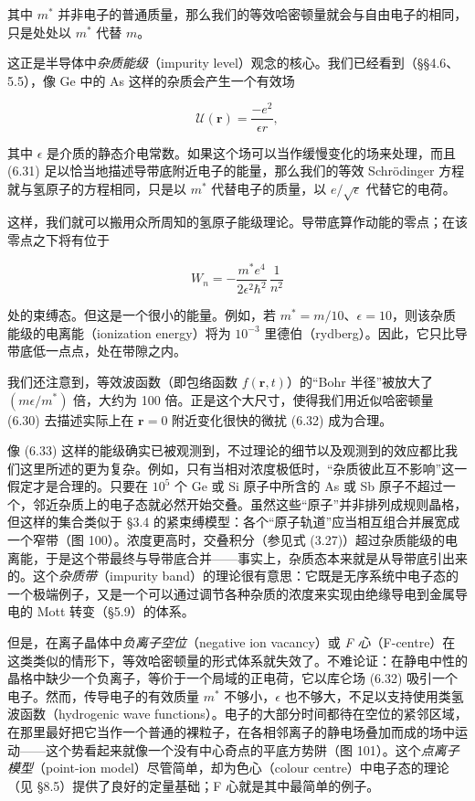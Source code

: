 其中 $m^{*}$ 并非电子的普通质量，那么我们的等效哈密顿量就会与自由电子的相同，只是处处以 $m^{*}$ 代替 $m$。

这正是半导体中\emph{杂质能级}（impurity level）观念的核心。我们已经看到（§§4.6、5.5），像 Ge 中的 As 这样的杂质会产生一个有效场

\begin{equation*}
\mathcal{U}(\mathbf{r}) = \frac{-e^2}{\epsilon r},
\tag{6.32}
\end{equation*}

其中 $\epsilon$ 是介质的静态介电常数。如果这个场可以当作缓慢变化的场来处理，而且 (6.31) 足以恰当地描述导带底附近电子的能量，那么我们的等效 Schrödinger 方程就与氢原子的方程相同，只是以 $m^{*}$ 代替电子的质量，以 $e/\sqrt{\epsilon}$ 代替它的电荷。

这样，我们就可以搬用众所周知的氢原子能级理论。导带底算作动能的零点；在该零点之下将有位于

\begin{equation*}
W_n = -\frac{m^{*}e^{4}}{2\epsilon^{2}\hbar^{2}}\,\frac{1}{n^{2}}
\tag{6.33}
\end{equation*}

处的束缚态。但这是一个很小的能量。例如，若 $m^{*} = m/10$、$\epsilon = 10$，则该杂质能级的电离能（ionization energy）将为 $10^{-3}$ 里德伯（rydberg）。因此，它只比导带底低一点点，处在带隙之内。

我们还注意到，等效波函数（即包络函数 $f(\mathbf{r},t)$）的“Bohr 半径”被放大了 $(m\epsilon/m^{*})$ 倍，大约为 100 倍。正是这个大尺寸，使得我们用近似哈密顿量 (6.30) 去描述实际上在 $\mathbf{r}=0$ 附近变化很快的微扰 (6.32) 成为合理。


像 (6.33) 这样的能级确实已被观测到，不过理论的细节以及观测到的效应都比我们这里所述的更为复杂。例如，只有当相对浓度极低时，“杂质彼此互不影响”这一假定才是合理的。只要在 $10^{5}$ 个 Ge 或 Si 原子中所含的 As 或 Sb 原子不超过一个，邻近杂质上的电子态就必然开始交叠。虽然这些“原子”并非排列成规则晶格，但这样的集合类似于 §3.4 的紧束缚模型：各个“原子轨道”应当相互组合并展宽成一个窄带（图 100）。浓度更高时，交叠积分（参见式 (3.27)）超过杂质能级的电离能，于是这个带最终与导带底合并——事实上，杂质态本来就是从导带底引出来的。这个\emph{杂质带}（impurity band）的理论很有意思：它既是无序系统中电子态的一个极端例子，又是一个可以通过调节各种杂质的浓度来实现由绝缘导电到金属导电的 Mott 转变（§5.9）的体系。


但是，在离子晶体中\emph{负离子空位}（negative ion vacancy）或 \emph{F 心}（F-centre）在这类类似的情形下，等效哈密顿量的形式体系就失效了。不难论证：在静电中性的晶格中缺少一个负离子，等价于一个局域的正电荷，它以库仑场 (6.32) 吸引一个电子。然而，传导电子的有效质量 $m^{*}$ 不够小，$\epsilon$ 也不够大，不足以支持使用类氢波函数（hydrogenic wave functions）。电子的大部分时间都待在空位的紧邻区域，在那里最好把它当作一个普通的裸粒子，在各相邻离子的静电场叠加而成的场中运动——这个势看起来就像一个没有中心奇点的平底方势阱（图 101）。这个\emph{点离子模型}（point-ion model）尽管简单，却为色心（colour centre）中电子态的理论（见 §8.5）提供了良好的定量基础；F 心就是其中最简单的例子。

